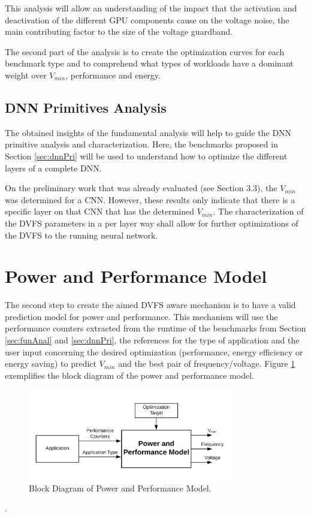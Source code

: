 This analysis will allow an understanding of the impact that the activation and deactivation of the different GPU components cause on the voltage noise, the main contributing factor to the size of the voltage guardband.

The second part of the analysis is to create the optimization curves for each benchmark type and to comprehend what types of workloads have a dominant weight over $V_{min}$, performance and energy.


\subsection{DNN Primitives Analysis}
The obtained insights of the fundamental analysis will help to guide the DNN primitive analysis and characterization. Here, the benchmarks proposed in Section \ref{sec:dnnPri} will be used to understand how to optimize the different layers of a complete DNN. 

On the preliminary work that was already evaluated (see Section 3.3), the $V_{min}$ was determined for a CNN. However, these results only indicate that there is a specific layer on that CNN that has the determined  $V_{min}$. The characterization of the DVFS parameters in a per layer way shall allow for further optimizations of the DVFS to the running neural network.

\section{Power and Performance Model}
The second step to create the aimed DVFS aware mechanism is to have a valid prediction model for power and performance. This mechanism will use the performance counters extracted from the runtime of the benchmarks from Section \ref{sec:funAnal} and \ref{sec:dnnPri}, the references for the type of application and the user input concerning the desired optimization (performance, energy efficiency or energy saving) to predict $V_{min}$ and the best pair of frequency/voltage. Figure \ref{fig:model} exemplifies the block diagram of the power and performance model.

\begin{figure}[!htb]
  \centering
  \includegraphics[width=0.8\textwidth]{Figures/Proposel/model.png}
  \caption[Controller]{Block Diagram of Power and Performance Model.}
  \label{fig:model}
\end{figure}. 

